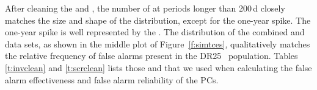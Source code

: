 
After cleaning the  and , the number of  at periods longer than 200\,d closely matches the size and shape of the \opstce{} distribution, except for the one-year spike. The one-year spike is well represented by the .  The distribution of the combined \invtce{} and \scrtce{} data sets, as shown in the middle plot of Figure~\ref{f:simtces}, qualitatively matches the relative frequency of false alarms present in the DR25 \opstce\ population. Tables\,\ref{t:invclean} and \ref{t:scrclean} lists those  and  that we used when calculating the false alarm effectiveness and false alarm reliability of the PCs.


